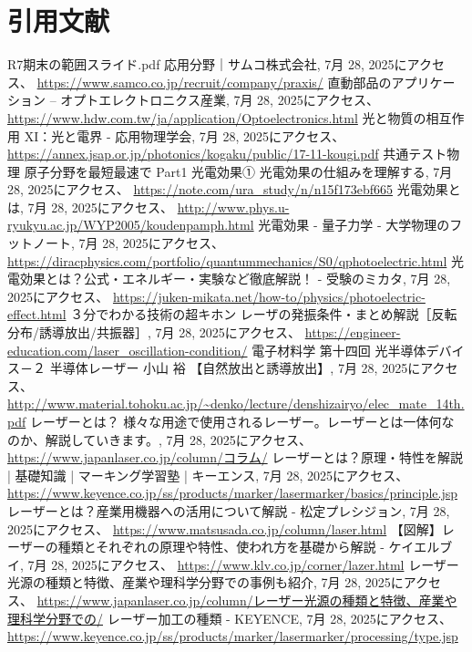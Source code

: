 \documentclass[11pt,a4paper]{ltjsarticle}
\begin{document}
\section*{引用文献}
\begin{thebibliography}{99}
     R7期末の範囲スライド.pdf
     応用分野｜サムコ株式会社, 7月 28, 2025にアクセス、 \url{https://www.samco.co.jp/recruit/company/praxis/}
     直動部品のアプリケーション – オプトエレクトロニクス産業, 7月 28, 2025にアクセス、 \url{https://www.hdw.com.tw/ja/application/Optoelectronics.html}
     光と物質の相互作用 XI：光と電界 - 応用物理学会, 7月 28, 2025にアクセス、 \url{https://annex.jsap.or.jp/photonics/kogaku/public/17-11-kougi.pdf}
     共通テスト物理 原子分野を最短最速で Part1 光電効果① 光電効果の仕組みを理解する, 7月 28, 2025にアクセス、 \url{https://note.com/ura_study/n/n15f173ebf665}
     光電効果とは, 7月 28, 2025にアクセス、 \url{http://www.phys.u-ryukyu.ac.jp/WYP2005/koudenpamph.html}
     光電効果 - 量子力学 - 大学物理のフットノート, 7月 28, 2025にアクセス、 \url{https://diracphysics.com/portfolio/quantummechanics/S0/qphotoelectric.html}
     光電効果とは？公式・エネルギー・実験など徹底解説！ - 受験のミカタ, 7月 28, 2025にアクセス、 \url{https://juken-mikata.net/how-to/physics/photoelectric-effect.html}
     ３分でわかる技術の超キホン レーザの発振条件・まとめ解説［反転分布/誘導放出/共振器］, 7月 28, 2025にアクセス、 \url{https://engineer-education.com/laser_oscillation-condition/}
     電子材料学 第十四回 光半導体デバイス－２ 半導体レーザー 小山 裕 【自然放出と誘導放出】, 7月 28, 2025にアクセス、 \url{http://www.material.tohoku.ac.jp/~denko/lecture/denshizairyo/elec_mate_14th.pdf}
     レーザーとは？ 様々な用途で使用されるレーザー。レーザーとは一体何なのか、解説していきます。, 7月 28, 2025にアクセス、 \url{https://www.japanlaser.co.jp/column/コラム/}
     レーザーとは？原理・特性を解説 | 基礎知識 | マーキング学習塾 | キーエンス, 7月 28, 2025にアクセス、 \url{https://www.keyence.co.jp/ss/products/marker/lasermarker/basics/principle.jsp}
     レーザーとは？産業用機器への活用について解説 - 松定プレシジョン, 7月 28, 2025にアクセス、 \url{https://www.matsusada.co.jp/column/laser.html}
     【図解】レーザーの種類とそれぞれの原理や特性、使われ方を基礎から解説 - ケイエルブイ, 7月 28, 2025にアクセス、 \url{https://www.klv.co.jp/corner/lazer.html}
     レーザー光源の種類と特徴、産業や理科学分野での事例も紹介, 7月 28, 2025にアクセス、 \url{https://www.japanlaser.co.jp/column/レーザー光源の種類と特徴、産業や理科学分野での/}
     レーザー加工の種類 - KEYENCE, 7月 28, 2025にアクセス、 \url{https://www.keyence.co.jp/ss/products/marker/lasermarker/processing/type.jsp}
\end{thebibliography}
\end{document}
